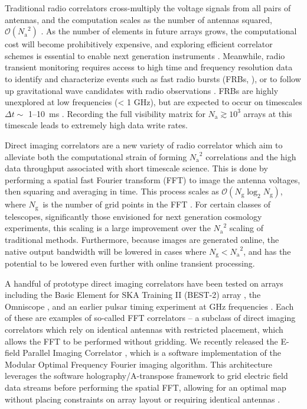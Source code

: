 \documentclass[a4paper,fleqn,usenatbib]{mnras}
\newcommand{\Nant}{\ensuremath{N_{\mathrm{a}}}}
\newcommand{\Ng}{\ensuremath{N_{\mathrm{g}}}}
\begin{document}
Traditional radio correlators cross-multiply the voltage signals from all pairs of antennas, and 
the computation scales as the number of antennas squared, $\mathcal{O}(\Nant^2)$ 
\citep{bun04}. As the number of elements in future arrays grows, the computational cost will 
become prohibitively expensive, and exploring efficient correlator schemes is essential to 
enable next generation instruments \citep{lon00}. Meanwhile, radio transient monitoring 
requires access to high time and frequency resolution data to identify and characterize events 
such as fast radio bursts (FRBs, \citealt{lor07}), or to follow up gravitational wave candidates 
with radio observations \citep{abb16a,abb16b}. FRBs are highly unexplored at low frequencies 
(< 1 GHz), but are expected to occur on timescales $\Delta t \sim$ 1--10~ms \citep{tho13}. 
Recording the full visibility matrix for $\Nant \gtrsim 10^3$ arrays at this timescale leads to 
extremely high data write rates. 

Direct imaging correlators are a new variety of radio correlator which aim to alleviate both the 
computational strain of forming $\Nant^2$ correlations and the high data throughput associated 
with short timescale science. This is done by performing a spatial fast Fourier transform (FFT) 
to image the antenna voltages, then squaring and averaging in time. This process scales as 
$\mathcal{O}(\Ng \log_2 \Ng)$, where \Ng~is the number of grid points in the FFT \citep{mor11,
 teg09, teg10}. For certain classes of telescopes, significantly those envisioned for next 
 generation cosmology experiments, this scaling is a large improvement over the $\Nant^2$ 
 scaling of traditional methods. Furthermore, because images are generated online, the native 
 output bandwidth will be lowered in cases where $\Ng < \Nant^2$, and has the potential to be 
 lowered even further with online transient processing.

A handful of prototype direct imaging correlators have been tested on arrays including the 
Basic Element for SKA Training II (BEST-2) array \citep{fos14}, the Omniscope \citep{zhe14}, 
and an earlier pulsar timing experiment at GHz frequencies \citep{oto94, dai00}. Each of these 
are examples of so-called FFT correlators -- a subclass of direct imaging correlators which rely 
on identical antennas with restricted placement, which allows the FFT to be performed without 
gridding. We recently released the E-field Parallel Imaging Correlator \citep[EPIC;][]{thy15c}, 
which is a software implementation of the Modular Optimal Frequency Fourier \citep[MOFF;][]
{mor11} imaging algorithm. This architecture leverages the software holography/A-transpose 
framework to grid electric field data streams before performing the spatial FFT, allowing for an 
optimal map without placing constraints on array layout or requiring identical antennas 
\citep{mor09,bha08,teg97a}.
\end{document}
